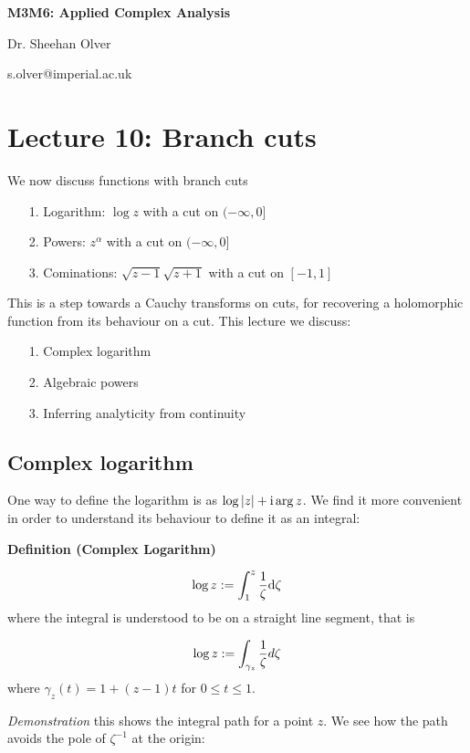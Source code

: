 \documentclass[12pt,a4paper]{article}
\def\D{ {\rm d} }
\def\I{ {\rm i} }
\begin{document}
\textbf{M3M6: Applied Complex Analysis}

Dr. Sheehan Olver

s.olver@imperial.ac.uk

\section{Lecture 10: Branch cuts}
We now discuss functions with branch cuts

\begin{itemize}
\item[1. ] Logarithm: $\log z$ with a cut on $(-\infty,0]$


\item[2. ] Powers: $z^\alpha$ with a cut on $(-\infty,0]$


\item[3. ] Cominations: $\sqrt{z-1}\sqrt{z+1}$ with a cut on $[-1,1]$

\end{itemize}
This is a step towards a Cauchy transforms on cuts, for recovering a holomorphic function from its behaviour on a cut. This lecture we discuss:

\begin{itemize}
\item[1. ] Complex logarithm


\item[2. ] Algebraic powers


\item[3. ] Inferring analyticity from continuity

\end{itemize}
\subsection{Complex logarithm}
One way to define the logarithm is as $\log|z| + \I \arg z$. We find it more convenient in order to understand its behaviour to define it as an integral:

\textbf{Definition (Complex Logarithm)}

\[
\log z := \int_1^z {1 \over \zeta} \D\zeta
\]
where the integral is understood to be on a straight line segment, that is

\[
\log z := \int_{\gamma_z} {1 \over \zeta} d\zeta
\]
where $\gamma_z(t) = 1 + (z-1)t$ for $0 \leq t \leq 1$.

\emph{Demonstration} this shows the integral path for a point $z$. We see how the path avoids the pole of $\zeta^{-1}$ at the origin:
\end{document}
